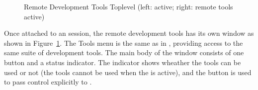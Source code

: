 \begin{figure}[bt]
\begin{center}
\end{center}
\caption{Remote Development Tools Toplevel (left: {\eclipse} active; right:
remote tools active)}
\label{remotetools}
\end{figure}

Once attached to an {\eclipse} session, the remote development tools has
its own window as shown in Figure~\ref{remotetools}. The Tools menu is the
same as in {\tkeclipse}, providing access to the same suite of development
tools. The main body of the window consists of one button and a status
indicator. The indicator shows wheather the tools can be used or not (the
tools cannot be used when the {\eclipse} is active), and the button
is used to pass control explicitly to {\eclipse}.

